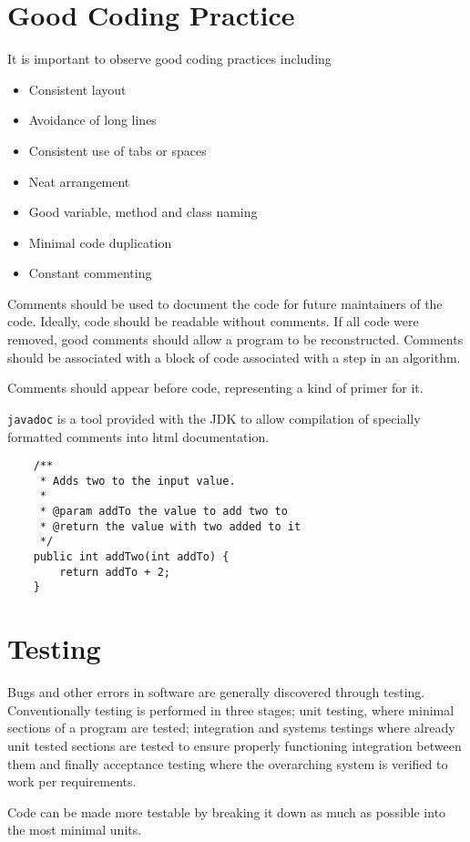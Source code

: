 \documentclass[12pt]{report}
\newcommand{\code}[1]{\lstinline{#1}}
\begin{document}
\begin{flushleft}
\section*{Good Coding Practice}

It is important to observe good coding practices including

\begin{itemize}
    \item Consistent layout
    \item Avoidance of long lines
    \item Consistent use of tabs or spaces
    \item Neat arrangement
    \item Good variable, method and class naming
    \item Minimal code duplication
    \item Constant commenting
\end{itemize}

Comments should be used to document the code for future maintainers of the
code. Ideally, code should be readable without comments. If all code were
removed, good comments should allow a program to be reconstructed. Comments
should be associated with a block of code associated with a step in an
algorithm. \par
Comments should appear before code, representing a kind of primer for it. \par
\code{javadoc} is a tool provided with the JDK to allow compilation of
specially formatted comments into html documentation.

\begin{lstlisting}
    /**
     * Adds two to the input value.
     *
     * @param addTo the value to add two to
     * @return the value with two added to it
     */
    public int addTwo(int addTo) {
        return addTo + 2;
    }
\end{lstlisting}

\section*{Testing}

Bugs and other errors in software are generally discovered through testing.
Conventionally testing is performed in three stages; unit testing, where
minimal sections of a program are tested; integration and systems testings
where already unit tested sections are tested to ensure properly functioning
integration between them and finally acceptance testing where the overarching
system is verified to work per requirements. \par
Code can be made more testable by breaking it down as much as possible into the
most minimal units.


\end{flushleft}
\end{document}
